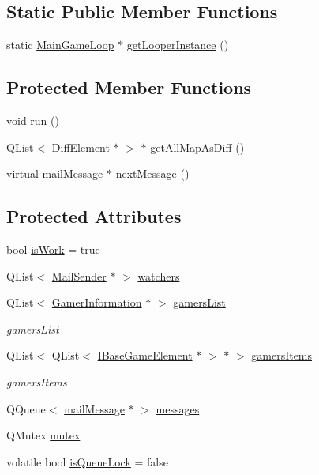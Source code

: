 \subsection*{Static Public Member Functions}
\begin{DoxyCompactItemize}
\item 
static \hyperlink{a00209}{Main\+Game\+Loop} $\ast$ \hyperlink{a00209_ae4df98e12ba90efd73b144455d9fd52d}{get\+Looper\+Instance} ()
\end{DoxyCompactItemize}
\subsection*{Protected Member Functions}
\begin{DoxyCompactItemize}
\item 
void \hyperlink{a00209_a5a20009c07c887a9cf69381f62da5009}{run} ()
\item 
Q\+List$<$ \hyperlink{a00141}{Diff\+Element} $\ast$ $>$ $\ast$ \hyperlink{a00209_ac4cd47d8b350ae45ea09aaecad11a684}{get\+All\+Map\+As\+Diff} ()
\item 
virtual \hyperlink{a00201}{mail\+Message} $\ast$ \hyperlink{a00197_a127a70ec582190f90979cb72b8cba72c}{next\+Message} ()
\end{DoxyCompactItemize}
\subsection*{Protected Attributes}
\begin{DoxyCompactItemize}
\item 
bool \hyperlink{a00209_a03ce2a112152dc80acce53528cc65daf}{is\+Work} = true
\item 
Q\+List$<$ \hyperlink{a00205}{Mail\+Sender} $\ast$ $>$ \hyperlink{a00209_a14693d2e6fdac35ab6af44a9080871f2}{watchers}
\item 
Q\+List$<$ \hyperlink{a00213}{Gamer\+Information} $\ast$ $>$ \hyperlink{a00209_aac8195bc3183cb0cabe65f1ff813fbfb}{gamers\+List}
\begin{DoxyCompactList}\small\item\em gamers\+List \end{DoxyCompactList}\item 
Q\+List$<$ Q\+List$<$ \hyperlink{a00137}{I\+Base\+Game\+Element} $\ast$ $>$ $\ast$ $>$ \hyperlink{a00209_a7e240933ce2cf3b29a05c5061aa5226b}{gamers\+Items}
\begin{DoxyCompactList}\small\item\em gamers\+Items \end{DoxyCompactList}\item 
Q\+Queue$<$ \hyperlink{a00201}{mail\+Message} $\ast$ $>$ \hyperlink{a00197_ace6950e3788bb037f23ce8668ef83829}{messages}
\item 
Q\+Mutex \hyperlink{a00197_a116d4905d302bdb69c00b54b621dd827}{mutex}
\item 
volatile bool \hyperlink{a00197_a33c370cb3c6292cd800008a67002a67f}{is\+Queue\+Lock} = false
\end{DoxyCompactItemize}

